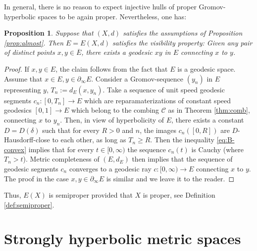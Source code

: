 \documentclass[12pt]{amsbook}%
\newtheorem{prop}[thm]{Proposition}
\theoremstyle{definition}
\theoremstyle{remark}
\numberwithin{section}{chapter}
\numberwithin{subsection}{section}
\numberwithin{figure}{chapter}
\def\cC{{\mathscr{C}}}
\def\geo{\partial_\infty}
\def\ol{\overline}
\def\kap{}
\begin{document}
In general, there is no reason to expect injective hulls of proper Gromov-hyperbolic spaces to be again proper. Nevertheless, one has:


\begin{prop}\label{prop:hull-visibility}
Suppose that $(X,d)$ satisfies the assumptions of Proposition \ref{prop:almost}. Then $E=E(X,d)$ 
satisfies the {\em visibility} property: Given any pair 
of distinct points $x, y\in \ol{E}$, there exists a geodesic $xy$ in $E$ connecting $x$ to $y$. 
\end{prop}
\begin{proof} If $x, y\in E$, the claim follows from the fact that $E$ is a geodesic space. Assume that $x\in E, y\in \geo E$. Consider a Gromov-sequence $(y_n)$ in $E$ representing $y$, $T_n:= d_E(x,y_n)$.  Take a sequence of unit speed geodesic segments $c_n: [0, T_n]\to E$ which are reparamaterizations of constant speed 
geodesics $[0,1]\to E$ which belong to the combing $\cC$ as in Theorem \ref{thm:comb}, connecting $x$ to $y_n$. Then, in view of hyperbolicity of $E$, there exists a constant $D=D(\delta)$ such that for every $R>0$ and $n$, the images $c_n([0,R])$ are $D$-Hausdorff-close to each other, as long as $T_n\geqslant R$. Then the inequality \eqref{eq:B-convex} implies that for every $t\in [0,\infty)$ the sequence $c_n(t)$ is Cauchy (where $T_n>t$). Metric completeness of $(E,d_E)$ then implies that the sequence of geodesic 
segments $c_n$ converges to a geodesic ray $c: [0,\infty)\to E$ connecting $x$ to $y$. The proof in the case $x, y\in \geo E$ is similar and we leave it to the reader.  
\end{proof}

Thus, $E(X)$ is semiproper provided that $X$ is proper, see Definition \ref{def:semiproper}.










\section{Strongly hyperbolic metric spaces} \label{sec:strong hyperbolicity}
\end{document}
